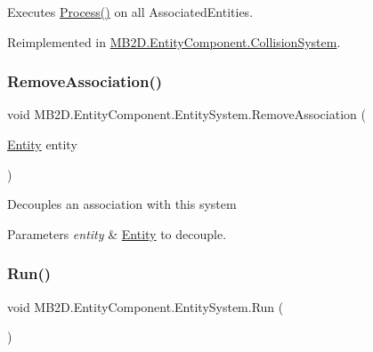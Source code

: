 Executes \hyperlink{class_m_b2_d_1_1_entity_component_1_1_entity_system_abbf83b87cb5d12754fb058cef50451fa}{Process()} on all Associated\+Entities. 



Reimplemented in \hyperlink{class_m_b2_d_1_1_entity_component_1_1_collision_system_a06249adc606475cdc35f28783a1b27c4}{M\+B2\+D.\+Entity\+Component.\+Collision\+System}.

\hypertarget{class_m_b2_d_1_1_entity_component_1_1_entity_system_a6fa9406e1f4a0ca8ddf21cf04be3abe3}{}\label{class_m_b2_d_1_1_entity_component_1_1_entity_system_a6fa9406e1f4a0ca8ddf21cf04be3abe3} 
\subsubsection{\texorpdfstring{Remove\+Association()}{RemoveAssociation()}}
{\footnotesize\ttfamily void M\+B2\+D.\+Entity\+Component.\+Entity\+System.\+Remove\+Association (\begin{DoxyParamCaption}\item[{\hyperlink{class_m_b2_d_1_1_entity_component_1_1_entity}{Entity}}]{entity }\end{DoxyParamCaption})\hspace{0.3cm}{\ttfamily [inline]}}



Decouples an association with this system 


\begin{DoxyParams}{Parameters}
{\em entity} & \hyperlink{class_m_b2_d_1_1_entity_component_1_1_entity}{Entity} to decouple.\\
\hline
\end{DoxyParams}
\hypertarget{class_m_b2_d_1_1_entity_component_1_1_entity_system_a3a1a74c4d3f8f0f452e0cdaa5515face}{}\label{class_m_b2_d_1_1_entity_component_1_1_entity_system_a3a1a74c4d3f8f0f452e0cdaa5515face} 
\subsubsection{\texorpdfstring{Run()}{Run()}}
{\footnotesize\ttfamily void M\+B2\+D.\+Entity\+Component.\+Entity\+System.\+Run (\begin{DoxyParamCaption}{ }\end{DoxyParamCaption})\hspace{0.3cm}{\ttfamily [inline]}}



